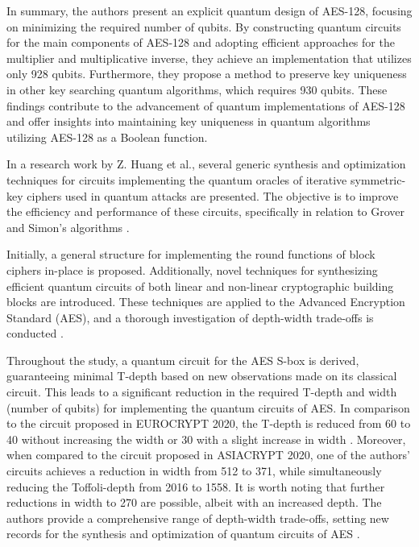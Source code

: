 In summary, the authors present an explicit quantum design of AES-128, focusing on minimizing the required number of qubits. By constructing quantum circuits for the main components of AES-128 and adopting efficient approaches for the multiplier and multiplicative inverse, they achieve an implementation that utilizes only 928 qubits. Furthermore, they propose a method to preserve key uniqueness in other key searching quantum algorithms, which requires 930 qubits. These findings contribute to the advancement of quantum implementations of AES-128 and offer insights into maintaining key uniqueness in quantum algorithms utilizing AES-128 as a Boolean function. 


In a research work by Z. Huang et al., several generic synthesis and optimization techniques for circuits implementing the quantum oracles of iterative symmetric-key ciphers used in quantum attacks are presented. The objective is to improve the efficiency and performance of these circuits, specifically in relation to Grover and Simon's algorithms \cite{huang2022synthesizing}. 
 

Initially, a general structure for implementing the round functions of block ciphers in-place is proposed. Additionally, novel techniques for synthesizing efficient quantum circuits of both linear and non-linear cryptographic building blocks are introduced. These techniques are applied to the Advanced Encryption Standard (AES), and a thorough investigation of depth-width trade-offs is conducted \cite{strand2021status}. 
 

Throughout the study, a quantum circuit for the AES S-box is derived, guaranteeing minimal T-depth based on new observations made on its classical circuit. This leads to a significant reduction in the required T-depth and width (number of qubits) for implementing the quantum circuits of AES. In comparison to the circuit proposed in EUROCRYPT 2020, the T-depth is reduced from 60 to 40 without increasing the width or 30 with a slight increase in width \cite{jaques2020grover}. Moreover, when compared to the circuit proposed in ASIACRYPT 2020, one of the authors' circuits achieves a reduction in width from 512 to 371, while simultaneously reducing the Toffoli-depth from 2016 to 1558. It is worth noting that further reductions in width to 270 are possible, albeit with an increased depth. The authors provide a comprehensive range of depth-width trade-offs, setting new records for the synthesis and optimization of quantum circuits of AES \cite{huang2022synthesizing}. 
 

